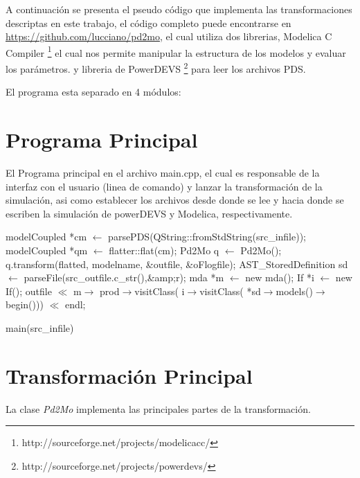 	A continuación se presenta el pseudo código que implementa las transformaciones descriptas en este trabajo, 
	el código completo puede encontrarse en \url{https://github.com/lucciano/pd2mo}, el cual utiliza dos librerias, Modelica C Compiler 
	\footnote{http://sourceforge.net/projects/modelicacc/} el cual nos permite manipular la estructura de los modelos y evaluar los parámetros.
y libreria de PowerDEVS \footnote{http://sourceforge.net/projects/powerdevs/} para leer los archivos PDS.

El programa esta separado en 4 módulos:

\section{Programa Principal}

El Programa principal en el archivo main.cpp, el cual es responsable de la interfaz con el usuario (linea de comando) y lanzar la transformación de la simulación, asi como establecer los archivos desde donde se lee y hacia donde se escriben la simulación de powerDEVS y Modelica, respectivamente.


\begin{algorithm}
\begin{algorithmic}[1]
\State modelCoupled *cm $\gets$ parsePDS(QString::fromStdString(src\_infile));
\State modelCoupled *qm $\gets$ flatter::flat(cm);
\State Pd2Mo q $\gets$ Pd2Mo();
\State q.transform(flatted, modelname, \&outfile, \&oFlogfile);
\State AST\_StoredDefinition sd $\gets$ parseFile(src\_outfile.c\_str(),\&amp;r);
\State mda *m $\gets$ new mda();
\State If *i $\gets$ new If();
\State outfile $\ll$ m$\rightarrow$ 
		{prod$\rightarrow$visitClass( i$\rightarrow$visitClass( 
			*sd$\rightarrow$models()$\rightarrow$begin()))} $\ll$ endl;

\end{algorithmic}
\caption{main(src\_infile)}
\end{algorithm}

\section{Transformación Principal}
La clase \emph{Pd2Mo} implementa las principales partes de la transformación.

